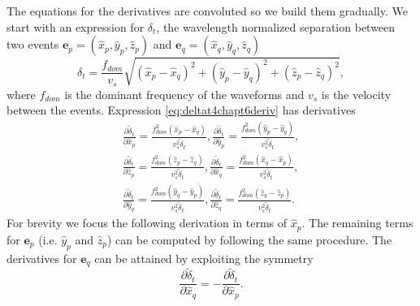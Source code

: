 \documentclass[extra]{gji}
\begin{document}
The equations for the derivatives are convoluted so we build them
gradually. We start with an expression for $\delta_t$, the
wavelength normalized separation between two events $\mathbf{e}_p=
(\hat{x}_p,\hat{y}_p,\hat{z}_p)$ and $\mathbf{e}_q =
(\hat{x}_q,\hat{y}_q,\hat{z}_q)$
\begin{equation}
\label{eq:deltat4chapt6deriv}
\delta_t = \frac{f_{dom}}{v_s}\sqrt{(\hat{x}_p-\hat{x}_q)^2 + (\hat{y}_p-\hat{y}_q)^2 +  (\hat{z}_p-\hat{z}_q)^2},
\end{equation}
where $f_{dom}$ is the dominant frequency of the waveforms and $v_s$ is the velocity between the events. Expression
\ref{eq:deltat4chapt6deriv} has derivatives
\begin{equation}
\label{eq-partial-xyz1}
\begin{array}{l}
\frac{\partial \widetilde{\delta}_t}{\partial \hat{x}_p} = \frac{f_{dom}^2 (\hat{x}_p-\hat{x}_q)}{v_s^2 \widetilde{\delta}_t},
\frac{\partial \widetilde{\delta}_t}{\partial \hat{y}_p} = \frac{f_{dom}^2 (\hat{y}_p-\hat{y}_q)}{v_s^2 \widetilde{\delta}_t}, \\
\frac{\partial \widetilde{\delta}_t}{\partial \hat{z}_p} = \frac{f_{dom}^2 (\hat{z}_p-\hat{z}_q)}{v_s^2 \widetilde{\delta}_t},
\frac{\partial \widetilde{\delta}_t}{\partial \hat{x}_q} = \frac{f_{dom}^2 (\hat{x}_q-\hat{x}_p)}{v_s^2 \widetilde{\delta}_t}, \\
\frac{\partial \widetilde{\delta}_t}{\partial \hat{y}_q} = \frac{f_{dom}^2 (\hat{y}_q-\hat{y}_p)}{v_s^2 \widetilde{\delta}_t},
\frac{\partial \widetilde{\delta}_t}{\partial \hat{z}_q} = \frac{f_{dom}^2 (\hat{z}_q-\hat{z}_p)}{v_s^2 \widetilde{\delta}_t}.
\end{array}
\end{equation}
For brevity we focus the following derivation in terms of $\hat{x}_p$. The remaining terms for $\mathbf{e}_p$
(i.e. $\hat{y}_p$ and $\hat{z}_p$) can be computed
by following the same procedure. The derivatives for $\mathbf{e}_q$ can be attained by exploiting the symmetry
\begin{equation}
\label{eq:ep2eq-deriv-symmetry}
\frac{\partial \widetilde{\delta}_t}{\partial \hat{x}_q} = - \frac{\partial \widetilde{\delta}_t}{\partial \hat{x}_p}.
\end{equation}
\end{document}

